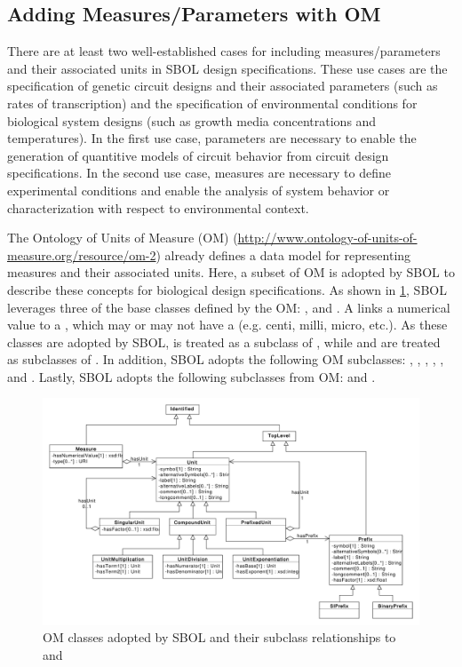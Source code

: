 \subsection{Adding Measures/Parameters with OM}
\label{sec:parameters}

There are at least two well-established cases for including measures/parameters and their associated units in SBOL design specifications. These use cases are the specification of genetic circuit designs and their associated parameters (such as rates of transcription) and the specification of environmental conditions for biological system designs (such as growth media concentrations and temperatures). In the first use case, parameters are necessary to enable the generation of quantitive models of circuit behavior from circuit design specifications. In the second use case, measures are necessary to define experimental conditions and enable the analysis of system behavior or characterization with respect to environmental context.

The Ontology of Units of Measure (OM) (\url{http://www.ontology-of-units-of-measure.org/resource/om-2}) already defines a data model for representing measures and their associated units. Here, a subset of OM is adopted by SBOL to describe these concepts for biological design specifications. As shown in \ref{uml:om}, SBOL leverages three of the base classes defined by the OM: ,  and . A  links a numerical value to a , which may or may not have a  (e.g. centi, milli, micro, etc.). As these classes are adopted by SBOL,  is treated as a subclass of , while  and  are treated as subclasses of . In addition, SBOL adopts the following OM  subclasses: , , , , , and . Lastly, SBOL adopts the following  subclasses from OM:  and .

\begin{figure}[ht]
\begin{center}
\includegraphics[width=\linewidth]{uml/om}
\caption[]{OM classes adopted by SBOL and their subclass relationships to  and }
\label{uml:om}
\end{center}
\end{figure}

